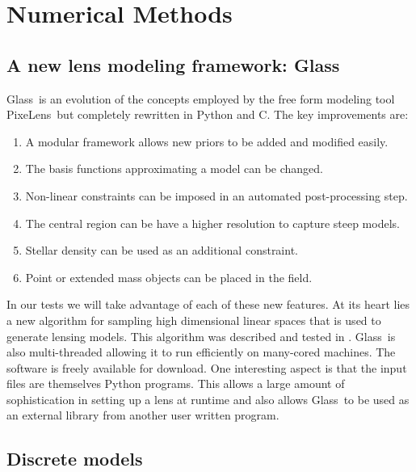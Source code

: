 \documentclass[onecolumn,galley]{mn2e}
\newcommand{\Glass}{{\sc Glass}}
\newcommand{\PixeLens}{{\sc PixeLens}}
\begin{document}
\section{Numerical Methods} 

\subsection{A new lens modeling framework: \Glass}

\Glass\ is an evolution of the concepts employed by the free form modeling tool
\PixeLens\ but completely rewritten in Python and C. The key improvements are:
\begin{enumerate}
  \item A modular framework allows new priors to be added and modified easily.
  \item The basis functions approximating a model can be changed. 
  \item Non-linear constraints can be imposed in an automated post-processing step. 
  \item The central region can be have a higher resolution to capture steep models. 
  \item Stellar density can be used as an additional constraint.  
  \item Point or extended mass objects can be placed in the field.
\end{enumerate}
In our tests we will take advantage of each of these new features.  At its
heart lies a new algorithm for sampling high dimensional linear spaces that is
used to generate lensing models. This algorithm was described and tested in
\cite{}. \Glass\ is also multi-threaded allowing it to run efficiently on
many-cored machines.  The software is freely available for download. One
interesting aspect is that the input files are themselves Python programs. This
allows a large amount of sophistication in setting up a lens at runtime and
also allows \Glass\ to be used as an external library from another user written
program.

\subsection{Discrete models}
\end{document}
